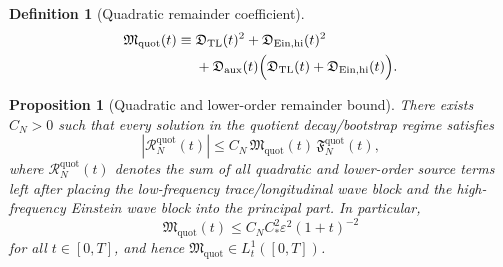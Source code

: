 \documentclass[11pt]{article}
\newtheorem{definition}{Definition}
\newtheorem{proposition}{Proposition}
\begin{document}
\begin{definition}[Quadratic remainder coefficient]
\begin{align}
\mathfrak M_{\mathrm{quot}}(t)
\equiv\;&
\mathfrak D_{\mathrm{TL}}(t)^2
+\mathfrak D_{\mathrm{Ein,hi}}(t)^2
\nonumber\\
&+
\mathfrak D_{\mathrm{aux}}(t)\Bigl(
\mathfrak D_{\mathrm{TL}}(t)
+\mathfrak D_{\mathrm{Ein,hi}}(t)
\Bigr).
\label{eq:Mdef}
\end{align}
\end{definition}

\begin{proposition}[Quadratic and lower-order remainder bound]
\label{prop:remainder}
There exists \(C_N>0\) such that every solution in the quotient decay/bootstrap regime satisfies
\begin{equation}
|\mathcal R_N^{\mathrm{quot}}(t)|
\le
C_N\,\mathfrak M_{\mathrm{quot}}(t)\,\mathfrak F_N^{\mathrm{quot}}(t),
\label{eq:Rbound}
\end{equation}
where \(\mathcal R_N^{\mathrm{quot}}(t)\) denotes the sum of all quadratic and lower-order source terms left after placing the low-frequency trace/longitudinal wave block and the high-frequency Einstein wave block into the principal part. In particular,
\begin{equation}
\mathfrak M_{\mathrm{quot}}(t)
\le
C_N C_\ast^2\varepsilon^2(1+t)^{-2}
\label{eq:Mrate}
\end{equation}
for all \(t\in[0,T]\), and hence \(\mathfrak M_{\mathrm{quot}}\in L_t^1([0,T])\).
\end{proposition}
\end{document}
